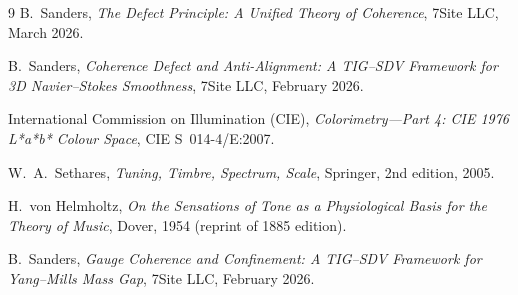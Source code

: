 \documentclass[11pt]{article}
\theoremstyle{definition}
\theoremstyle{remark}
\begin{document}
\begin{thebibliography}{9}
B.~Sanders, \textit{The Defect Principle: A Unified Theory of Coherence},
7Site LLC, March 2026.

B.~Sanders, \textit{Coherence Defect and Anti-Alignment: A TIG--SDV Framework
for 3D Navier--Stokes Smoothness}, 7Site LLC, February 2026.

International Commission on Illumination (CIE),
\textit{Colorimetry---Part 4: CIE 1976 L*a*b* Colour Space},
CIE S~014-4/E:2007.

W.~A.~Sethares, \textit{Tuning, Timbre, Spectrum, Scale},
Springer, 2nd edition, 2005.

H.~von Helmholtz, \textit{On the Sensations of Tone as a Physiological Basis
for the Theory of Music}, Dover, 1954 (reprint of 1885 edition).

B.~Sanders, \textit{Gauge Coherence and Confinement: A TIG--SDV Framework for
Yang--Mills Mass Gap}, 7Site LLC, February 2026.
\end{thebibliography}
\end{document}
